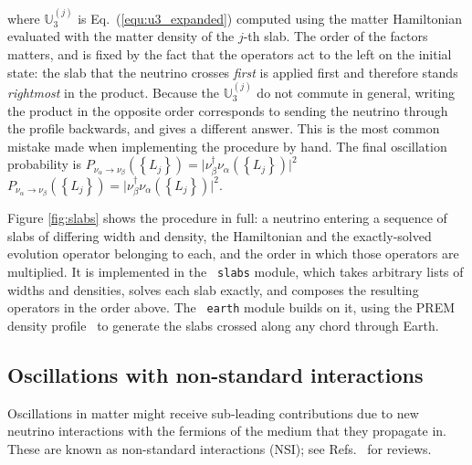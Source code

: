 \documentclass[final,5p,times,twocolumn]{elsarticle}
\newcommand{\eq}{Eq.}
\newcommand{\Refs}{Refs.}
\newcommand{\equ}[1]{\eq~(\ref{equ:#1})}
\providecommand{\DIFaddtex}[1]{{\protect\color{blue} \sf #1}} %
\providecommand{\DIFdeltex}[1]{{\protect\color{red} \scriptsize #1}} %
\providecommand{\DIFaddbegin}{} %
\providecommand{\DIFaddend}{} %
\providecommand{\DIFdelbegin}{} %
\providecommand{\DIFdelend}{} %
\providecommand{\DIFadd}[1]{\DIFaddtex{#1}} %
\providecommand{\DIFdel}[1]{\DIFdeltex{#1}} %
\begin{document}
\DIFaddend where $\mathbb{U}_3^{(j)}$ is \equ{u3_expanded} computed using the matter Hamiltonian evaluated with the matter density of the $j$-th slab.  The \DIFaddbegin \DIFadd{order of the factors matters, and is fixed by the fact that the operators act to the left on the initial state: the slab that the neutrino crosses }\emph{\DIFadd{first}} \DIFadd{is applied first and therefore stands }\emph{\DIFadd{rightmost}} \DIFadd{in the product.  Because the $\mathbb{U}_3^{(j)}$ do not commute in general, writing the product in the opposite order corresponds to sending the neutrino through the profile backwards, and gives a different answer.  This is the most common mistake made when implementing the procedure by hand.  The }\DIFaddend final oscillation probability is \DIFdelbegin \DIFdel{$P_{\nu_\alpha \to \nu_\beta}(\left\{ L_j \right\}) = \lvert \nu_\beta^\dagger \nu_\alpha(\left\{L_j\right\}) \rvert^2$}\DIFdelend \DIFaddbegin \DIFadd{$P_{\nu_\alpha \to \nu_\beta}\left(\left\{ L_j \right\}\right) = \lvert \nu_\beta^\dagger \nu_\alpha\left(\left\{L_j\right\}\right) \rvert^2$}\DIFaddend .

\DIFaddbegin \DIFadd{Figure \ref{fig:slabs} shows the procedure in full: a neutrino entering a sequence of slabs of differing width and density, the Hamiltonian and the exactly-solved evolution operator belonging to each, and the order in which those operators are multiplied.  It is implemented in the }{\tt \DIFadd{slabs}} \DIFadd{module, which takes arbitrary lists of widths and densities, solves each slab exactly, and composes the resulting operators in the order above.  The }{\tt \DIFadd{earth}} \DIFadd{module builds on it, using the PREM density profile\ }\cite{Dziewonski:1981xy} \DIFadd{to generate the slabs crossed along any chord through Earth.
}


\DIFaddend \subsection{Oscillations with non-standard interactions}

Oscillations in matter might receive sub-leading contributions due to new neutrino interactions with the fermions of the medium that they propagate in.  These are known as non-standard interactions (NSI); see \Refs\ \cite{Ohlsson:2012kf, Miranda:2015dra, Farzan:2017xzy, Esteban:2018ppq} for reviews.  
\end{document}
